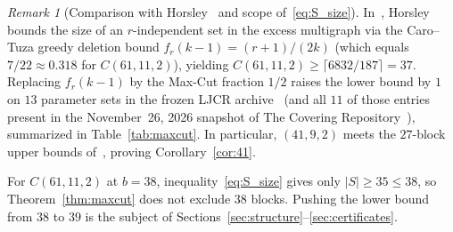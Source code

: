 \documentclass[11pt,a4paper]{article}
\theoremstyle{definition}
\theoremstyle{remark}
\newtheorem{remark}[theorem]{Remark}
\begin{document}
\begin{remark}[Comparison with Horsley~\cite{Horsley2017} and scope of~\eqref{eq:S_size}]\label{rem:barrier}
In~\cite{Horsley2017}, Horsley bounds the size of an $r$-independent set in the excess multigraph via the Caro--Tuza greedy deletion bound $f_r(k-1) = (r+1)/(2k)$ (which equals $7/22 \approx 0.318$ for $C(61,11,2)$), yielding $C(61,11,2) \ge \lceil 6832/187 \rceil = 37$. Replacing $f_r(k-1)$ by the Max-Cut fraction $1/2$ raises the lower bound by $1$ on $13$ parameter sets in the frozen LJCR archive~\cite{GordonLJCR} (and all $11$ of those entries present in the November~26, 2026 snapshot of The Covering Repository~\cite{AcerbiCR}), summarized in Table~\ref{tab:maxcut}. In particular, $(41,9,2)$ meets the $27$-block upper bounds of~\cite{Meliwat2026,Canli2026}, proving Corollary~\ref{cor:41}.

For $C(61,11,2)$ at $b = 38$, inequality~\eqref{eq:S_size} gives only $|S| \ge 35 \le 38$, so Theorem~\ref{thm:maxcut} does not exclude $38$ blocks. Pushing the lower bound from $38$ to $39$ is the subject of Sections~\ref{sec:structure}--\ref{sec:certificates}.
\end{remark}
\end{document}
